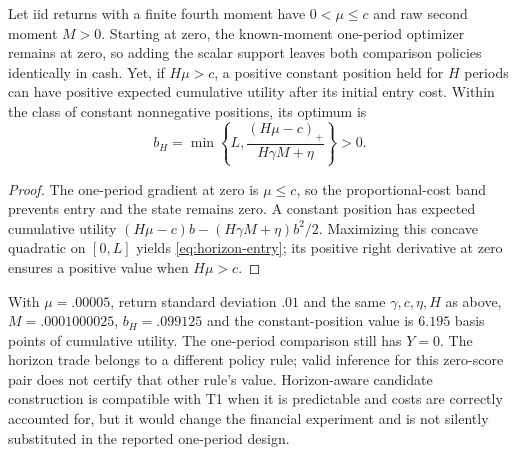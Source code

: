 \begin{proposition}
Let iid returns with a finite fourth moment have $0<\mu\le c$ and raw second
moment $M>0$. Starting at
zero, the known-moment one-period optimizer remains at zero, so adding the
scalar support leaves both comparison policies identically in cash. Yet, if
$H\mu>c$, a positive constant position held for $H$ periods can have positive
expected cumulative utility after its initial entry cost. Within the class of
constant nonnegative positions, its optimum is
\begin{equation}
 b_H=\min\left\{L,\frac{(H\mu-c)_+}{H\gamma M+\eta}\right\}>0.
 \label{eq:horizon-entry}
\end{equation}
\end{proposition}
\begin{proof}
The one-period gradient at zero is $\mu\le c$, so the proportional-cost band
prevents entry and the state remains zero. A constant position has expected
cumulative utility $(H\mu-c)b-(H\gamma M+\eta)b^2/2$. Maximizing this concave
quadratic on $[0,L]$ yields \eqref{eq:horizon-entry}; its positive right
derivative at zero ensures a positive value when $H\mu>c$.
\end{proof}

With $\mu=.00005$, return standard deviation $.01$ and the same $\gamma,c,
\eta,H$ as above, $M=.0001000025$, $b_H=.099125$ and the constant-position
value is $6.195$ basis points of cumulative utility. The one-period comparison
still has $Y=0$. The horizon trade belongs to a different policy rule; valid
inference for this zero-score pair does not certify that other rule's value.
Horizon-aware candidate construction is compatible with T1 when
it is predictable and costs are correctly accounted for, but it would change
the financial experiment and is not silently substituted in the reported
one-period design.
